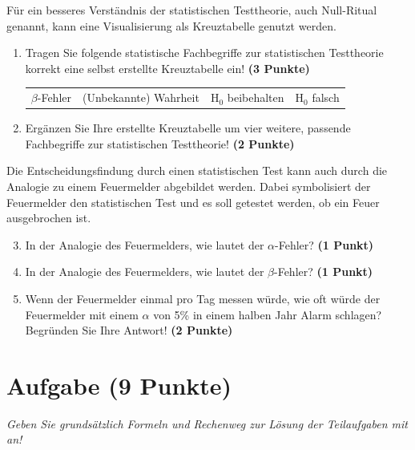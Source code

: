 \documentclass[a4paper, 9pt]{scrartcl}\usepackage[]{graphicx}\usepackage[]{xcolor}
\begin{document}
F{\"u}r ein besseres Verst{\"a}ndnis der statistischen Testtheorie, auch
Null-Ritual genannt, kann eine Visualisierung als Kreuztabelle genutzt werden.  

\begin{enumerate}
\item Tragen Sie folgende statistische Fachbegriffe zur statistischen
  Testtheorie korrekt eine selbst erstellte Kreuztabelle ein! \textbf{(3
    Punkte)}
  \begin{center}
  \begin{tabular}{cccc}
  $\beta$-Fehler & (Unbekannte) Wahrheit & H$_0$ beibehalten & H$_0$ falsch \\
  \end{tabular}
  \end{center}
\item Erg{\"a}nzen Sie Ihre erstellte Kreuztabelle um vier weitere, passende
  Fachbegriffe zur statistischen Testtheorie! \textbf{(2 Punkte)}
\end{enumerate}

Die Entscheidungsfindung durch einen statistischen Test kann auch durch die
Analogie zu einem Feuermelder abgebildet werden. Dabei symbolisiert der
Feuermelder den statistischen Test und es soll getestet werden, ob ein Feuer
ausgebrochen ist.

\begin{enumerate}
  \setcounter{enumi}{2}    
\item In der Analogie des Feuermelders, wie lautet der $\alpha$-Fehler? \textbf{(1 Punkt)}
\item In der Analogie des Feuermelders, wie lautet der $\beta$-Fehler? \textbf{(1 Punkt)}
\item Wenn der Feuermelder einmal pro Tag messen w{\"u}rde, wie oft w{\"u}rde der
  Feuermelder mit einem $\alpha$ von 5\% in einem halben Jahr Alarm schlagen?
  Begr{\"u}nden Sie Ihre Antwort! \textbf{(2 Punkte)}
\end{enumerate}



 
\clearpage

\section{Aufgabe \hfill (9 Punkte)}

\textit{Geben Sie grunds{\"a}tzlich Formeln und Rechenweg zur L{\"o}sung der
  Teilaufgaben mit an!} \\[1Ex]
\end{document}
